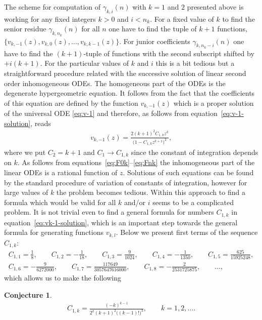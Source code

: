 \documentclass[pdftex]{sigma}
\numberwithin{equation}{section}
\newtheorem{Conjecture}[Theorem]{Conjecture}
\begin{document}
The scheme for computation of $\gamma_{k,i}(n)$ with $k=1$ and $2$ presented above is working for any fixed
integers $k>0$ and $i<n_k$. For a fixed value of $k$ to find the senior residue $\gamma_{k,n_k}(n)$ for all $n$
one have to find the tuple of $k+1$ functions, $\{v_{k,-1}(z),v_{k,0}(z),\ldots,v_{k,k-1}(z)\}$. For junior
coefficients $\gamma_{k,n_k-i}(n)$ one have to find the $(k+1)$-tuple of functions with the second subscript
shifted by $+i(k+1)$. For the particular values of $k$ and $i$ this is a bit tedious but a straightforward
procedure related with the successive solution of linear second order inhomogeneous ODEs.
The homogeneous part of the ODEs is the degenerate hypergeometric equation. It follows from the fact that
the coefficients of this equation are defined by the function $v_{k,-1}(z)$ which is a proper solution of
the universal ODE \eqref{eq:v-1} and therefore, as follows from equation~\eqref{eq:v-1-solution}, reads
\begin{gather}\label{eq:vk-1-solution}
v_{k,-1}(z)=\frac{2(k+1)^2C_{1,k}z^{k}}{\big(1-C_{1,k}z^{k+1}\big)^2},
\end{gather}
where we put $C_2=k+1$ and $C_1\to C_{1,k}$ since the constant of integration depends on $k$. As follows from
equations~\eqref{eq:F0k}--\eqref{eq:Fnk} the inhomogeneous part of the linear ODEs is a rational function of $z$.
Solutions of such equations can be found by the standard procedure of variation of constants of integration,
however for large values of $k$ the problem becomes tedious. Within this approach to find a formula which
would be valid for all $k$ and/or $i$ seems to be a complicated problem. It is not trivial even to find a
general formula for numbers $C_{1,k}$ in equation~\eqref{eq:vk-1-solution}, which is an important step towards
the general formula for generating functions $v_{k,l}$. Below we present first terms of the sequence $C_{1,k}$:
\begin{gather*}
C_{1,1}=\frac18,\qquad
C_{1,2}=-\frac1{18},\qquad
C_{1,3}=\frac9{1024},\qquad
C_{1,4}=-\frac1{1350},\qquad
C_{1,5}=\frac{625}{15925248},\\
C_{1,6}=-\frac9{6272000},\qquad
C_{1,7}=\frac{117649}{3057647616000},\qquad
C_{1,8}=-\frac{2}{2531725875},\qquad \ldots,
\end{gather*}
which allows us to make the following
\begin{Conjecture}\label{con:C1k}
\begin{gather*}
C_{1,k}=\frac{(-k)^{k-1}}{2^{k}(k+1)^2\big((k-1)!\big)^3},\qquad
k=1,2,\ldots.
\end{gather*}
\end{Conjecture}
\end{document}
